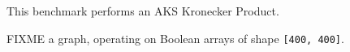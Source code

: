This benchmark performs an AKS Kronecker Product.

FIXME a graph, operating on Boolean arrays of shape {\tt [400, 400]}. 


